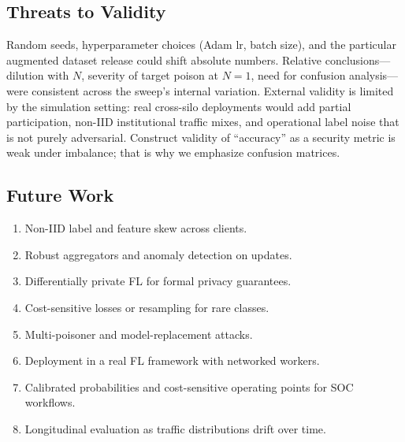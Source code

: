 \documentclass[journal]{IEEEtran}
\begin{document}
\subsection{Threats to Validity}
Random seeds, hyperparameter choices (Adam lr, batch size), and the particular augmented dataset release could shift absolute numbers. Relative conclusions---dilution with $N$, severity of target poison at $N=1$, need for confusion analysis---were consistent across the sweep's internal variation. External validity is limited by the simulation setting: real cross-silo deployments would add partial participation, non-IID institutional traffic mixes, and operational label noise that is not purely adversarial. Construct validity of ``accuracy'' as a security metric is weak under imbalance; that is why we emphasize confusion matrices.

\subsection{Future Work}
\begin{enumerate}
\item Non-IID label and feature skew across clients.
\item Robust aggregators and anomaly detection on updates.
\item Differentially private FL for formal privacy guarantees.
\item Cost-sensitive losses or resampling for rare classes.
\item Multi-poisoner and model-replacement attacks.
\item Deployment in a real FL framework with networked workers.
\item Calibrated probabilities and cost-sensitive operating points for SOC workflows.
\item Longitudinal evaluation as traffic distributions drift over time.
\end{enumerate}
\end{document}
